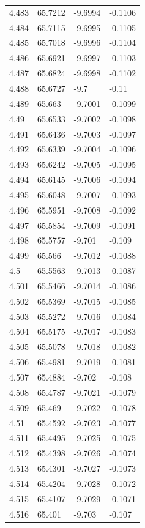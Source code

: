 \begin{tabular}{llll}
4.483 & 65.7212 & -9.6994 & -0.1106 \\
4.484 & 65.7115 & -9.6995 & -0.1105 \\
4.485 & 65.7018 & -9.6996 & -0.1104 \\
4.486 & 65.6921 & -9.6997 & -0.1103 \\
4.487 & 65.6824 & -9.6998 & -0.1102 \\
4.488 & 65.6727 & -9.7 & -0.11 \\
4.489 & 65.663 & -9.7001 & -0.1099 \\
4.49 & 65.6533 & -9.7002 & -0.1098 \\
4.491 & 65.6436 & -9.7003 & -0.1097 \\
4.492 & 65.6339 & -9.7004 & -0.1096 \\
4.493 & 65.6242 & -9.7005 & -0.1095 \\
4.494 & 65.6145 & -9.7006 & -0.1094 \\
4.495 & 65.6048 & -9.7007 & -0.1093 \\
4.496 & 65.5951 & -9.7008 & -0.1092 \\
4.497 & 65.5854 & -9.7009 & -0.1091 \\
4.498 & 65.5757 & -9.701 & -0.109 \\
4.499 & 65.566 & -9.7012 & -0.1088 \\
4.5 & 65.5563 & -9.7013 & -0.1087 \\
4.501 & 65.5466 & -9.7014 & -0.1086 \\
4.502 & 65.5369 & -9.7015 & -0.1085 \\
4.503 & 65.5272 & -9.7016 & -0.1084 \\
4.504 & 65.5175 & -9.7017 & -0.1083 \\
4.505 & 65.5078 & -9.7018 & -0.1082 \\
4.506 & 65.4981 & -9.7019 & -0.1081 \\
4.507 & 65.4884 & -9.702 & -0.108 \\
4.508 & 65.4787 & -9.7021 & -0.1079 \\
4.509 & 65.469 & -9.7022 & -0.1078 \\
4.51 & 65.4592 & -9.7023 & -0.1077 \\
4.511 & 65.4495 & -9.7025 & -0.1075 \\
4.512 & 65.4398 & -9.7026 & -0.1074 \\
4.513 & 65.4301 & -9.7027 & -0.1073 \\
4.514 & 65.4204 & -9.7028 & -0.1072 \\
4.515 & 65.4107 & -9.7029 & -0.1071 \\
4.516 & 65.401 & -9.703 & -0.107 \\

\end{tabular}
